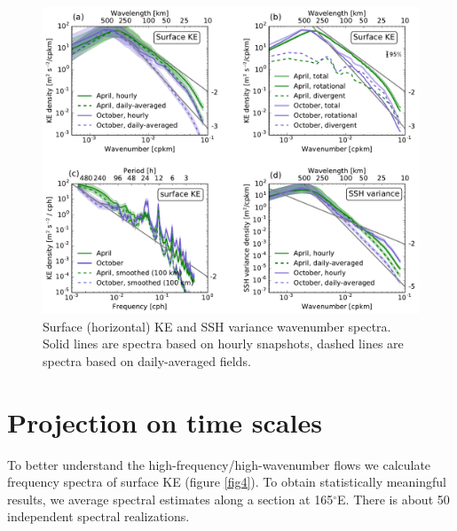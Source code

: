 \documentclass[grl]{agutex2015}
\begin{document}
\begin{article}
%
%
%




\begin{figure}[ht]
  \begin{center}
    \includegraphics[width=.9\textwidth]{figs/fig3.pdf}
 \caption{Surface (horizontal) KE and SSH variance wavenumber spectra. Solid lines
 are spectra based on hourly snapshots, dashed lines are spectra based on daily-averaged
 fields.}
 \label{fig3}
 \end{center}
\end{figure}

\section{Projection on time scales}
To better understand the high-frequency/high-wavenumber flows  we calculate frequency
spectra of surface KE (figure \ref{fig4}). To obtain statistically meaningful results,
we average spectral estimates along a section at 165$^\circ$E.  There is about 50
independent spectral realizations.


\end{article}
\end{document}
